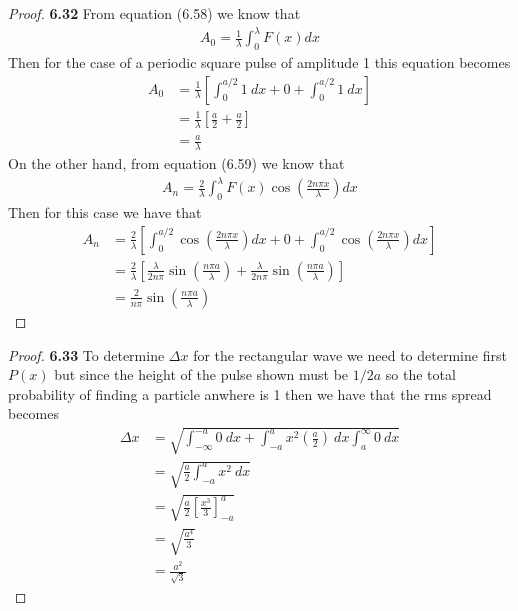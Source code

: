 \documentclass[11pt]{article}
\theoremstyle{definition}
\begin{document}
\begin{proof}{\textbf{6.32}}
    From equation (6.58) we know that
    \begin{align*}
        A_0 = \frac{1}{\lambda} \int_0^\lambda F(x) dx
    \end{align*}
    Then for the case of a periodic square pulse of amplitude 1 this equation
    becomes
    \begin{align*}
        A_0 &= \frac{1}{\lambda} \left[
            \int_0^{a/2} 1~dx
            + 0
            + \int_0^{a/2} 1~dx
        \right]\\
        &= \frac{1}{\lambda} \left[\frac{a}{2} + \frac{a}{2} \right]\\
        &= \frac{a}{\lambda}
    \end{align*}
    On the other hand, from equation (6.59) we know that 
    \begin{align*}
        A_n = \frac{2}{\lambda} \int_0^\lambda F(x)\cos\left(\frac{2n\pi x}{\lambda}\right) dx
    \end{align*}
    Then for this case we have that
    \begin{align*}
        A_n &= \frac{2}{\lambda} \left[
        \int_0^{a/2} \cos\left(\frac{2n\pi x}{\lambda}\right) dx + 0
        + \int_0^{a/2} \cos\left(\frac{2n\pi x}{\lambda}\right) dx
        \right]\\
        &=\frac{2}{\lambda} \left[
            \frac{\lambda}{2n\pi}\sin\left(\frac{n\pi a}{\lambda}\right)
            + \frac{\lambda}{2n\pi}\sin\left(\frac{n\pi a}{\lambda}\right)
        \right]\\
        &=\frac{2}{n\pi}\sin\left(\frac{n\pi a}{\lambda}\right)
    \end{align*}
\end{proof}
\cleardoublepage
\begin{proof}{\textbf{6.33}}
    To determine $\Delta x$ for the rectangular wave we need to determine first
    $P(x)$ but since the height of the pulse shown must be $1/2a$ so the total
    probability of finding a particle anwhere is 1 then we have that the
    rms spread becomes
    \begin{align*}
        \Delta x &= \sqrt{
            \int_{-\infty}^{-a} 0~dx
            + \int_{-a}^a x^2 \left(\frac{a}{2}\right)~dx
            \int_{a}^{\infty} 0~dx
        }\\
        &= \sqrt{
            \frac{a}{2}\int_{-a}^a x^2~dx
        }\\
        &= \sqrt{
            \frac{a}{2}\left[\frac{x^3}{3}\right]_{-a}^a
        }\\
        &= \sqrt{\frac{a^4}{3}}\\
        &= \frac{a^2}{\sqrt{3}}
    \end{align*} 
\end{proof}
\end{document}
